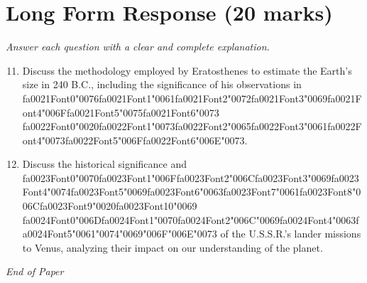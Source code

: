 \documentclass[12pt]{article}
\begin{document}
\section*{Long Form Response (20 marks)}
\textit{Answer each question with a clear and complete explanation.}
\begin{enumerate}[label=\arabic*.]
\setcounter{enumi}{10}
\item Discuss the methodology employed by Eratosthenes to estimate the Earth's size in 240 B.C.,
including the significance of his observations in {\csname fa0021Font0\endcsname\char"0076}{\csname fa0021Font1\endcsname\char"0061}{\csname fa0021Font2\endcsname\char"0072}{\csname fa0021Font3\endcsname\char"0069}{\csname fa0021Font4\endcsname\char"006F}{\csname fa0021Font5\endcsname\char"0075}{\csname fa0021Font6\endcsname\char"0073} {\csname fa0022Font0\endcsname\char"0020}{\csname fa0022Font1\endcsname\char"0073}{\csname fa0022Font2\endcsname\char"0065}{\csname fa0022Font3\endcsname\char"0061}{\csname fa0022Font4\endcsname\char"0073}{\csname fa0022Font5\endcsname\char"006F}{\csname fa0022Font6\endcsname\char"006E}{\char"0073}.
\item Discuss the historical significance and {\csname fa0023Font0\endcsname\char"0070}{\csname fa0023Font1\endcsname\char"006F}{\csname fa0023Font2\endcsname\char"006C}{\csname fa0023Font3\endcsname\char"0069}{\csname fa0023Font4\endcsname\char"0074}{\csname fa0023Font5\endcsname\char"0069}{\csname fa0023Font6\endcsname\char"0063}{\csname fa0023Font7\endcsname\char"0061}{\csname fa0023Font8\endcsname\char"006C}{\csname fa0023Font9\endcsname\char"0020}{\csname fa0023Font10\endcsname\char"0069} {\csname fa0024Font0\endcsname\char"006D}{\csname fa0024Font1\endcsname\char"0070}{\csname fa0024Font2\endcsname\char"006C}{\char"0069}{\csname fa0024Font4\endcsname\char"0063}{\csname fa0024Font5\endcsname\char"0061}{\char"0074}{\char"0069}{\char"006F}{\char"006E}{\char"0073} of the U.S.S.R.'s lander
missions to Venus, analyzing their impact on our understanding of the planet.
\end{enumerate}

\vfill
\noindent\textit{End of Paper}
\end{document}

